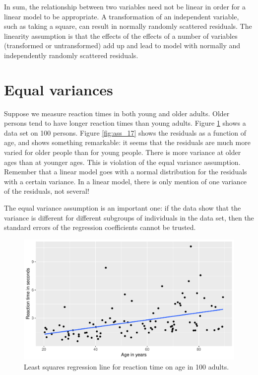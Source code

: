 \documentclass[]{book}\usepackage[]{graphicx}\usepackage[]{color}
\makeatletter
\def\maxwidth{ %
  \ifdim\Gin@nat@width>\linewidth
    \linewidth
  \else
    \Gin@nat@width
  \fi
}
\newenvironment{knitrout}{}{} %
\makeatother
\begin{document}
In sum, the relationship between two variables need not be linear in order for a linear model to be appropriate. A transformation of an independent variable, such as taking a square, can result in normally randomly scattered residuals. The linearity assumption is that the effects of the effects of a number of variables (transformed or untransformed) add up and lead to model with normally and  independently randomly scattered residuals.


\section{Equal variances}

Suppose we measure reaction times in both young and older adults. Older persons tend to have longer reaction times than young adults. Figure \ref{fig:ass_16} shows a data set on 100 persons. Figure \ref{fig:ass_17} shows the residuals as a function of age, and shows something remarkable: it seems that the residuals are much more varied for older people than for young people. There is more variance at older ages than at younger ages. This is violation of the equal variance assumption. Remember that a linear model goes with a normal distribution for the residuals with a certain variance. In a linear model, there is only mention of one variance of the residuals, not several!

The equal variance assumption is an important one: if the data show that the variance is different for different subgroups of individuals in the data set, then the standard errors of the regression coefficients cannot be trusted. 

\begin{knitrout}
\color{fgcolor}\begin{figure}

{\centering \includegraphics[width=\maxwidth]{figure/ass_16-1} 

}

\caption[Least squares regression line for reaction time on age in 100 adults]{Least squares regression line for reaction time on age in 100 adults.}\label{fig:ass_16}
\end{figure}


\end{knitrout}
\end{document}
